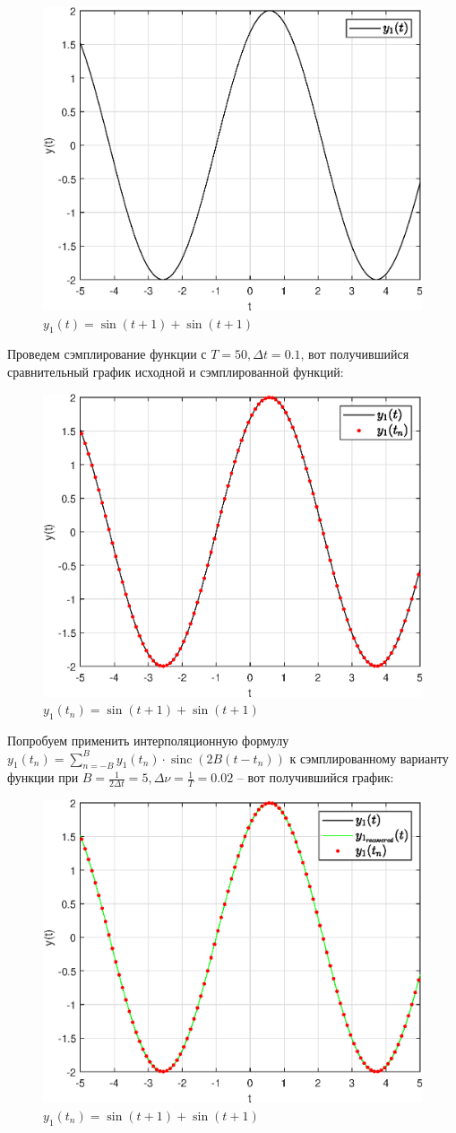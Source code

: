 \documentclass[a4paper]{article}
\begin{document}
\begin{figure}[H]
    \centering
    \includegraphics[width=0.5\linewidth]{graphs2/func1.eps}
    \caption{$y_1(t) = \sin{(t + 1)} + \sin{(t+1)}$}
\end{figure}

Проведем сэмплирование функции с $T = 50, \Delta t = 0.1$, вот получившийся сравнительный график исходной и сэмплированной функций:

\begin{figure}[H]
    \centering
    \includegraphics[width=0.5\linewidth]{graphs2/func1+discrete.eps}
    \caption{$y_1(t_n) = \sin{(t + 1)} + \sin{(t+1)}$}
\end{figure}

Попробуем применить интерполяционную формулу $y_1(t_n) = \sum_{n=-B}^{B} y_1(t_n) \cdot \operatorname{sinc}(2B(t-t_n))$ к сэмплированному варианту функции при $B = \frac{1}{2\Delta t} = 5, \Delta \nu = \frac{1}{T}=0.02$ -- вот получившийся график:

\begin{figure}[H]
    \centering
    \includegraphics[width=0.5\linewidth]{graphs2/func1_recovered.eps}
    \caption{$y_1(t_n) = \sin{(t + 1)} + \sin{(t+1)}$}
\end{figure}
\end{document}
